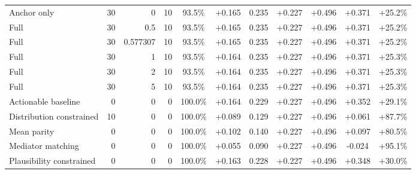 \begin{table}[htbp]
\begin{tabular}{lrrrccccccc}
Anchor only & 30 & 0 & 10 & 93.5\% & +0.165 & 0.235 & +0.227 & +0.496 & +0.371 & +25.2\% \\
Full & 30 & 0.5 & 10 & 93.5\% & +0.165 & 0.235 & +0.227 & +0.496 & +0.371 & +25.2\% \\
Full & 30 & 0.577307 & 10 & 93.5\% & +0.165 & 0.235 & +0.227 & +0.496 & +0.371 & +25.2\% \\
Full & 30 & 1 & 10 & 93.5\% & +0.164 & 0.235 & +0.227 & +0.496 & +0.371 & +25.3\% \\
Full & 30 & 2 & 10 & 93.5\% & +0.164 & 0.235 & +0.227 & +0.496 & +0.371 & +25.3\% \\
Full & 30 & 5 & 10 & 93.5\% & +0.164 & 0.235 & +0.227 & +0.496 & +0.371 & +25.3\% \\
Actionable baseline & 0 & 0 & 0 & 100.0\% & +0.164 & 0.229 & +0.227 & +0.496 & +0.352 & +29.1\% \\
Distribution constrained & 10 & 0 & 0 & 100.0\% & +0.089 & 0.129 & +0.227 & +0.496 & +0.061 & +87.7\% \\
Mean parity & 0 & 0 & 0 & 100.0\% & +0.102 & 0.140 & +0.227 & +0.496 & +0.097 & +80.5\% \\
Mediator matching & 0 & 0 & 0 & 100.0\% & +0.055 & 0.090 & +0.227 & +0.496 & -0.024 & +95.1\% \\
Plausibility constrained & 0 & 0 & 0 & 100.0\% & +0.163 & 0.228 & +0.227 & +0.496 & +0.348 & +30.0\% \\
\bottomrule
\end{tabular}
\end{table}